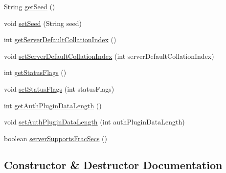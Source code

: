 \begin{DoxyCompactItemize}
\item 
String \mbox{\hyperlink{classcom_1_1mysql_1_1cj_1_1protocol_1_1a_1_1_native_capabilities_a727823b9358fc9be87cb3591ecc8b116}{get\+Seed}} ()
\item 
void \mbox{\hyperlink{classcom_1_1mysql_1_1cj_1_1protocol_1_1a_1_1_native_capabilities_afca806c5c21ceaae20c4253a9deb1528}{set\+Seed}} (String seed)
\item 
int \mbox{\hyperlink{classcom_1_1mysql_1_1cj_1_1protocol_1_1a_1_1_native_capabilities_adbb90b53368c7f639f652e71ea651993}{get\+Server\+Default\+Collation\+Index}} ()
\item 
void \mbox{\hyperlink{classcom_1_1mysql_1_1cj_1_1protocol_1_1a_1_1_native_capabilities_a392d20f56b7aa50f660d34ad3f88e001}{set\+Server\+Default\+Collation\+Index}} (int server\+Default\+Collation\+Index)
\item 
int \mbox{\hyperlink{classcom_1_1mysql_1_1cj_1_1protocol_1_1a_1_1_native_capabilities_a9c615c712e8d1820fe6b9eacb0e2661a}{get\+Status\+Flags}} ()
\item 
void \mbox{\hyperlink{classcom_1_1mysql_1_1cj_1_1protocol_1_1a_1_1_native_capabilities_ab2177d5aad98f819db246eaa7bf21069}{set\+Status\+Flags}} (int status\+Flags)
\item 
int \mbox{\hyperlink{classcom_1_1mysql_1_1cj_1_1protocol_1_1a_1_1_native_capabilities_a81da236be8151fdf8c68863c723dd087}{get\+Auth\+Plugin\+Data\+Length}} ()
\item 
void \mbox{\hyperlink{classcom_1_1mysql_1_1cj_1_1protocol_1_1a_1_1_native_capabilities_a32e01b6486a2d0b24c39e89b81ac21bd}{set\+Auth\+Plugin\+Data\+Length}} (int auth\+Plugin\+Data\+Length)
\item 
boolean \mbox{\hyperlink{classcom_1_1mysql_1_1cj_1_1protocol_1_1a_1_1_native_capabilities_af0128d4d52981bef0bab74ac88a57cb7}{server\+Supports\+Frac\+Secs}} ()
\end{DoxyCompactItemize}


\subsection{Constructor \& Destructor Documentation}
\mbox{\label{classcom_1_1mysql_1_1cj_1_1protocol_1_1a_1_1_native_capabilities_a598a62923a59e3a9422601250a0fc470}} 
